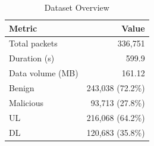 \begin{table}[htbp]
\centering
\caption{Dataset Overview}\label{tab:overview}
\begin{tabular}{lr}
\toprule
\textbf{Metric} & \textbf{Value} \\
\midrule
Total packets & 336,751 \\
Duration (s) & 599.9 \\
Data volume (MB) & 161.12 \\
Benign & 243,038 (72.2\%) \\
Malicious & 93,713 (27.8\%) \\
UL & 216,068 (64.2\%) \\
DL & 120,683 (35.8\%) \\
\bottomrule
\end{tabular}
\end{table}
